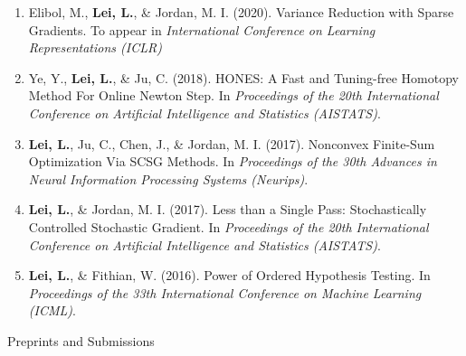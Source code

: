 \documentclass{article}
\begin{document}
\begin{enumerate}
\item Elibol, M., \textbf{Lei, L.}, \& Jordan, M. I. (2020). Variance Reduction with Sparse Gradients. To appear in \emph{International Conference on Learning Representations (ICLR)}
\item Ye, Y., \textbf{Lei, L.}, \& Ju, C. (2018). HONES: A Fast and Tuning-free Homotopy Method For Online Newton Step. In \emph{Proceedings of the 20th International Conference on Artificial Intelligence and Statistics (AISTATS)}.
\item \textbf{Lei, L.}, Ju, C., Chen, J., \& Jordan, M. I. (2017). Nonconvex Finite-Sum Optimization Via SCSG Methods. In \emph{Proceedings of the 30th Advances in Neural Information Processing Systems (Neurips)}.
\item \textbf{Lei, L.}, \& Jordan, M. I. (2017). Less than a Single Pass: Stochastically Controlled Stochastic Gradient. In \emph{Proceedings of the 20th International Conference on Artificial Intelligence and Statistics (AISTATS)}.
\item \textbf{Lei, L.}, \& Fithian, W. (2016). Power of Ordered Hypothesis Testing. In \emph{Proceedings of the 33th International Conference on Machine Learning (ICML)}.
\end{enumerate}

\begin{large}
\noindent Preprints and Submissions
\end{large}
\end{document}

